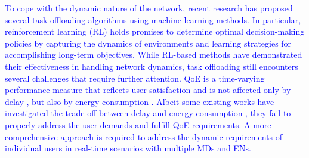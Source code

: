 \documentclass[12pt,draftclsnofoot,onecolumn]{IEEEtran}
\begin{document}








\textcolor{blue}{To cope with the dynamic nature of the network, recent research has proposed several task offloading algorithms using machine learning methods. In particular, reinforcement learning (RL) \cite{mnih2015human} holds promises to determine optimal decision-making policies by capturing the dynamics of environments and learning strategies for accomplishing long-term objectives.
	While RL-based methods have demonstrated their effectiveness in handling network dynamics, task offloading still encounters several challenges that require further attention. 
	QoE is a time-varying performance measure that reflects user satisfaction and is not affected only by delay \cite{guo2022energy}, but also by energy consumption \cite{tang2022uav}. Albeit some existing works have investigated the trade-off between delay and energy consumption \cite{li2022joint}, they fail to properly address the user demands and fulfill QoE requirements. A more comprehensive approach is required to address the dynamic requirements of individual users in real-time scenarios with multiple MDs and ENs.}
\end{document}
